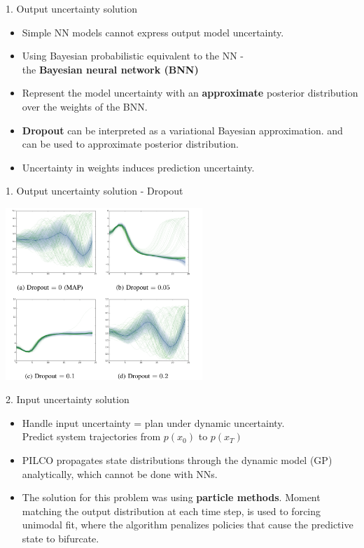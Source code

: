 \documentclass{beamer}
\begin{document}
\begin{frame}{1. Output uncertainty solution}
\begin{itemize}
    \item Simple NN models cannot express output model uncertainty.
    \item Using Bayesian probabilistic equivalent to the NN -\\ the \textbf{Bayesian neural network (BNN)}
    \item Represent the model uncertainty with an \textbf{approximate} posterior distribution over the weights of the BNN.
    \item \textbf{Dropout} can be interpreted as a variational Bayesian approximation. and can be used to approximate posterior distribution.
    \item Uncertainty in weights induces prediction uncertainty.
\end{itemize}
\end{frame}

\begin{frame}{1. Output uncertainty solution - Dropout}
    \begin{center}
        \includegraphics[height=6.5cm]{img/dropout.png}
    \end{center}
\end{frame}

\begin{frame}{2. Input uncertainty solution}
\begin{itemize}
    \item Handle input uncertainty = plan under dynamic uncertainty.\\
          Predict system trajectories from $p(x_0)$ to $p(x_T)$
    \item PILCO propagates state distributions through the dynamic model (GP) analytically, which cannot be done with NNs.
    \item The solution for this problem was using \textbf{particle methods}.
    \items Moment matching the output distribution at each time step, is used to forcing unimodal fit, where the algorithm penalizes policies that cause the predictive state to bifurcate.
\end{itemize}
\end{frame}
\end{document}
